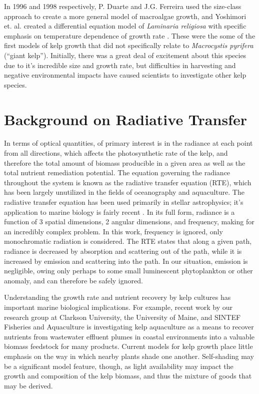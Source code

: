 In 1996 and 1998 respectively, P. Duarte and J.G. Ferreira used the size-class approach to create a more general model of macroalgae growth, and Yoshimori et. al. created a differential equation model of \textit{Laminaria religiosa} with specific emphasis on temperature dependence of growth rate \cite{duarte_model_1997,yoshimori_mathematical_1998}.
These were the some of the first models of kelp growth that did not specifically relate to \textit{Macrocystis pyrifera} (``giant kelp''). 
Initially, there was a great deal of excitement about this species due to it's incredible size and growth rate, but difficulties in harvesting and negative environmental impacts have caused scientists to investigate other kelp species. %

\section{Background on Radiative Transfer}
In terms of optical quantities, of primary interest is in the radiance at each point from all directions, which affects the photosynthetic rate of the kelp, and therefore the total amount of biomass producible in a given area as well as the total nutrient remediation potential.
The equation governing the radiance throughout the system is known as the radiative transfer equation (RTE), which has been largely unutilized in the fields of oceanography and aquaculture.
The radiative transfer equation has been used primarily in stellar astrophysics; it's application to marine biology is fairly recent \cite{mobley_radiative_2001}.
In its full form, radiance is a function of 3 spatial dimensions, 2 angular dimensions, and frequency, making for an incredibly complex problem. %
In this work, frequency is ignored, only monochromatic radiation is considered.
The RTE states that along a given path, radiance is decreased by absorption and scattering out of the path, while it is increased by emission and scattering into the path.
In our situation, emission is negligible, owing only perhaps to some small luminescent phytoplankton or other anomaly, and can therefore be safely ignored.

Understanding the growth rate and nutrient recovery by
kelp cultures has important marine biological implications. For example, recent
work by our research group at Clarkson University, the University of Maine, and
SINTEF Fisheries and Aquaculture is investigating kelp aquaculture as a means to
recover nutrients from wastewater effluent plumes in coastal environments into a
valuable biomass feedstock for many products. Current models for kelp growth
place little emphasis on the way in which nearby plants shade one another.
Self-shading may be a significant model feature, though, as light availability
may impact the growth and composition of the kelp biomass, and thus the mixture
of goods that may be derived.

